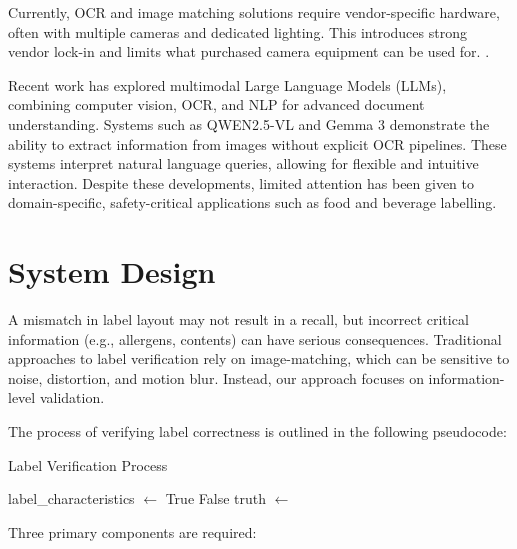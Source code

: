 \documentclass[conference]{IEEEtran}
\begin{document}
Currently, OCR and image matching solutions require vendor-specific hardware, often with multiple cameras and dedicated lighting. This introduces strong vendor lock-in and limits what purchased camera equipment can be used for. \cite{cognex2025,keyence2025,antares2025}. 

Recent work has explored multimodal Large Language Models (LLMs), combining computer vision, OCR, and NLP for advanced document understanding. Systems such as QWEN2.5-VL \cite{qwen2_5} and Gemma 3 \cite{gemma3} demonstrate the ability to extract information from images without explicit OCR pipelines. These systems interpret natural language queries, allowing for flexible and intuitive interaction. Despite these developments, limited attention has been given to domain-specific, safety-critical applications such as food and beverage labelling.

\section{System Design}
A mismatch in label layout may not result in a recall, but incorrect critical information (e.g., allergens, contents) can have serious consequences. Traditional approaches to label verification rely on image-matching, which can be sensitive to noise, distortion, and motion blur. Instead, our approach focuses on information-level validation.

The process of verifying label correctness is outlined in the following pseudocode:

\begin{algorithm}
\caption{Label Verification Process}
\begin{algorithmic}[1]
 
    \State label\_characteristics $\gets$ 
        \State \Return True
    \Else
        \State \Return False
    \EndIf
\EndFunction
\Statex
\State truth $\gets$ 
        \State {}
    \EndIf
\EndFor
\end{algorithmic}
\end{algorithm}

Three primary components are required:
\end{document}
